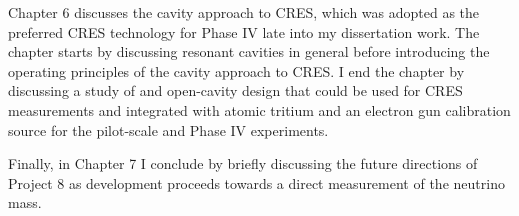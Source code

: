 Chapter 6 discusses the cavity approach to CRES, which was adopted as the preferred CRES technology for Phase IV late into my dissertation work. The chapter starts by discussing resonant cavities in general before introducing the operating principles of the cavity approach to CRES. I end the chapter by discussing a study of and open-cavity design that could be used for CRES measurements and integrated with atomic tritium and an electron gun calibration source for the pilot-scale and Phase IV experiments.

Finally, in Chapter 7 I conclude by briefly discussing the future directions of Project 8 as development proceeds towards a direct measurement of the neutrino mass. 




